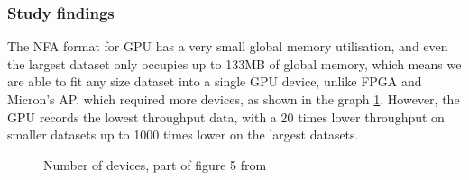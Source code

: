 \documentclass[10pt,onecolumn,twoside,english,a4paper]{article}
\begin{document}
\subsubsection{Study findings}
The NFA format for GPU has a very small global memory utilisation, and even the largest dataset only occupies up to 133MB of global memory, which means we are able to fit any size dataset into a single GPU device, unlike FPGA and Micron's AP, which required more devices, as shown in the graph \ref{devices:DemystifyingFSA}. However, the GPU records the lowest throughput data, with a 20 times lower throughput on smaller datasets up to 1000 times lower on the largest datasets.
\begin{figure}[h!]
  \centering
  \caption{Number of devices, part of figure 5 from \cite{Nourian:DemystifyingFSA}}
  \label{devices:DemystifyingFSA}
\end{figure}
\end{document}
